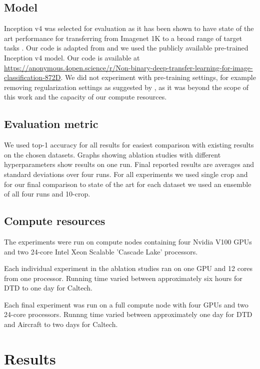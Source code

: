 \documentclass[]{article}
\begin{document}
\subsection{Model  \label{model}}
Inception v4 \cite{szegedy2017inception} was selected for evaluation
as it has been shown to have state of the art performance for transferring from Imagenet 1K to a broad range of target tasks \cite{kornblith2019better}.
Our code is adapted from \cite{rw2019timm} and we used the publicly available pre-trained Inception v4 model. Our code is available at \url{https://anonymous.4open.science/r/Non-binary-deep-transfer-learning-for-image-classification-872D}.
We did not experiment with pre-training settings, for example removing
regularization settings as suggested by \cite{kornblith2019better},
as it was beyond the scope of this work and the capacity of our compute resources.

\subsection{Evaluation metric}

We used top-1 accuracy for all results for easiest comparison with
existing results on the chosen datasets. Graphs showing ablation studies
with different hyperparameters show results on one run. Final reported
results are averages and standard deviations over four runs. For all
experiments we used single crop and for our final comparison to state
of the art for each dataset we used an ensemble of all four runs and 10-crop. 

\subsection{Compute resources \label{compute}}

The experiments were run on compute nodes containing four Nvidia V100 GPUs and two 24-core Intel Xeon Scalable 'Cascade Lake' processors. 

Each individual experiment in the ablation studies ran on one GPU and 12 cores from one processor. Running time varied between approximately six hours for DTD to one day for Caltech.

Each final experiment was run on a full compute node with four GPUs and two 24-core processors. Runnng time varied between approximately one day for DTD and Aircraft to two days for Caltech.

\section{Results}
\end{document}

